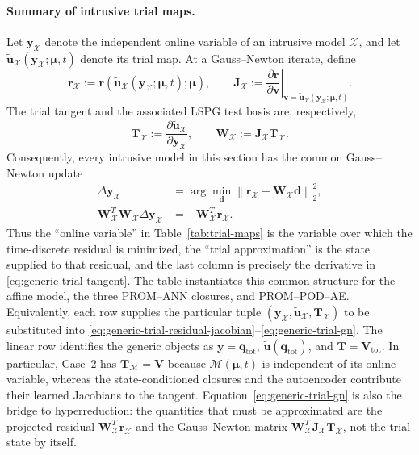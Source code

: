 \documentclass[11pt]{article}
\newcommand{\qtot}{\mathbf q_{\mathrm{tot}}}
\newcommand{\utilde}{\widetilde{\mathbf u}}
\newcommand{\mub}{\bm\mu}
\newcommand{\norm}[1]{\left\lVert #1 \right\rVert}
\begin{document}
\paragraph{Summary of intrusive trial maps.}
Let $\mathbf y_{\mathcal X}$ denote the independent online variable of an
intrusive model $\mathcal X$, and let
$\utilde_{\mathcal X}(\mathbf y_{\mathcal X};\mub,t)$ denote its trial map.
At a Gauss--Newton iterate, define
\begin{equation}
\mathbf r_{\mathcal X}:=
\mathbf r\!\left(\utilde_{\mathcal X}(\mathbf y_{\mathcal X};\mub,t);\mub\right),
\qquad
\mathbf J_{\mathcal X}:=
\left.\frac{\partial\mathbf r}{\partial\mathbf v}\right|_{
\mathbf v=\utilde_{\mathcal X}(\mathbf y_{\mathcal X};\mub,t)}.
\label{eq:generic-trial-residual-jacobian}
\end{equation}
The trial tangent and the associated LSPG test basis are, respectively,
\begin{equation}
\mathbf T_{\mathcal X}
:=\frac{\partial\utilde_{\mathcal X}}
{\partial\mathbf y_{\mathcal X}},
\qquad
\mathbf W_{\mathcal X}:=\mathbf J_{\mathcal X}\mathbf T_{\mathcal X}.
\label{eq:generic-trial-tangent}
\end{equation}
Consequently, every intrusive model in this section has the common
Gauss--Newton update
\begin{equation}
\begin{aligned}
\Delta\mathbf y_{\mathcal X}
&=\arg\min_{\mathbf d}
\norm{\mathbf r_{\mathcal X}+\mathbf W_{\mathcal X}\mathbf d}_2^2,\\
\mathbf W_{\mathcal X}^T\mathbf W_{\mathcal X}
\Delta\mathbf y_{\mathcal X}
&=-\mathbf W_{\mathcal X}^T\mathbf r_{\mathcal X}.
\end{aligned}
\label{eq:generic-trial-gn}
\end{equation}
Thus the ``online variable'' in Table~\ref{tab:trial-maps} is the variable
over which the time-discrete residual is minimized, the ``trial
approximation'' is the state supplied to that residual, and the last column
is precisely the derivative in \eqref{eq:generic-trial-tangent}.  The table
instantiates this common structure for the affine model, the three PROM--ANN
closures, and PROM--POD--AE.  Equivalently, each row supplies the particular
tuple $(\mathbf y_{\mathcal X},\utilde_{\mathcal X},
\mathbf T_{\mathcal X})$ to be substituted into
\eqref{eq:generic-trial-residual-jacobian}--\eqref{eq:generic-trial-gn}.
The linear row identifies the generic objects as
$\mathbf y=\qtot$, $\utilde(\qtot)$, and
$\mathbf T=\mathbf V_{\mathrm{tot}}$.
In particular, Case~2 has
$\mathbf T_{\mathcal M}=\mathbf V$ because $\mathcal M(\mub,t)$ is independent
of its online variable, whereas the state-conditioned closures and the
autoencoder contribute their learned Jacobians to the tangent.
Equation~\eqref{eq:generic-trial-gn} is also the bridge to hyperreduction:
the quantities that must be approximated are the projected residual
$\mathbf W_{\mathcal X}^T\mathbf r_{\mathcal X}$ and the Gauss--Newton matrix
$\mathbf W_{\mathcal X}^T\mathbf J_{\mathcal X}\mathbf T_{\mathcal X}$,
not the trial state by itself.
\end{document}
